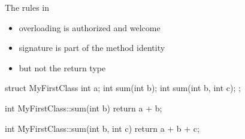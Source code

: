 \begin{frame}[fragile]
  \begin{block}{The rules in \cpp}
    \begin{itemize}
    \item overloading is authorized and welcome
    \item signature is part of the method identity
    \item but not the return type
    \end{itemize}
  \end{block}
  \begin{cppcode}
    struct MyFirstClass {
      int a;
      int sum(int b);
      int sum(int b, int c);
    };

    int MyFirstClass::sum(int b) { return a + b; }

    int MyFirstClass::sum(int b, int c) {
      return a + b + c;
    }
  \end{cppcode}
\end{frame}
